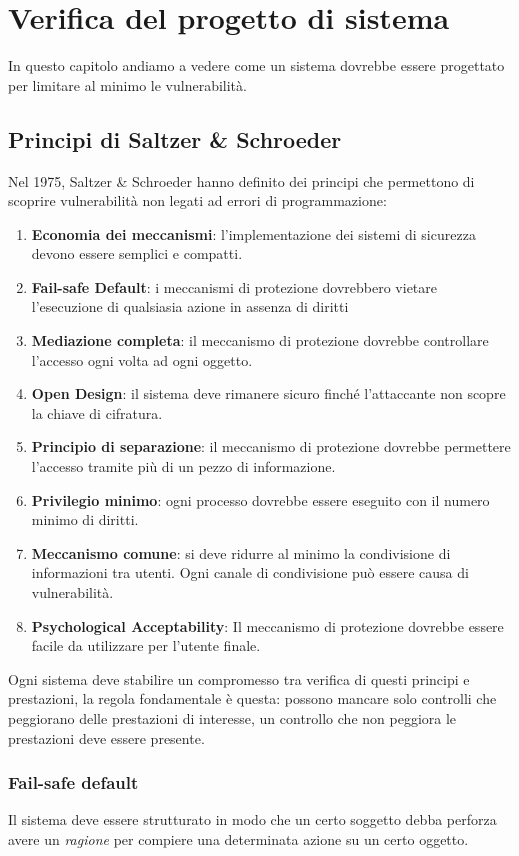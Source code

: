 \chapter{Verifica del progetto di sistema}
In questo capitolo andiamo a vedere come un sistema dovrebbe essere progettato per limitare al minimo le
vulnerabilità.

\section{Principi di Saltzer \& Schroeder}
Nel 1975, Saltzer \& Schroeder hanno definito dei principi che permettono di scoprire vulnerabilità non legati ad
errori di programmazione:
\begin{enumerate}
	\item \textbf{Economia dei meccanismi}: l'implementazione dei sistemi di sicurezza devono essere semplici e
	      compatti.
	\item \textbf{Fail-safe Default}: i meccanismi di protezione dovrebbero vietare l'esecuzione di qualsiasia
	      azione in assenza di diritti
	\item \textbf{Mediazione completa}: il meccanismo di protezione dovrebbe controllare l'accesso ogni volta ad
	      ogni oggetto.
	\item \textbf{Open Design}: il sistema deve rimanere sicuro finché l'attaccante non scopre la chiave di
	      cifratura.
	\item \textbf{Principio di separazione}: il meccanismo di protezione dovrebbe permettere l'accesso tramite più
	      di un pezzo di informazione.
	\item \textbf{Privilegio minimo}: ogni processo dovrebbe essere eseguito con il numero minimo di diritti.
	\item \textbf{Meccanismo comune}: si deve ridurre al minimo la condivisione di informazioni tra utenti. Ogni
	      canale di condivisione può essere causa di vulnerabilità.
	\item \textbf{Psychological Acceptability}: Il meccanismo di protezione dovrebbe essere facile da utilizzare
	      per l'utente finale.
\end{enumerate}
Ogni sistema deve stabilire un compromesso tra verifica di questi principi e prestazioni, la regola fondamentale è
questa: possono mancare solo controlli che peggiorano delle prestazioni di interesse, un controllo che non peggiora
le prestazioni deve essere presente.

\subsection{Fail-safe default}
Il sistema deve essere strutturato in modo che un certo soggetto debba perforza avere un \emph{ragione} per compiere
una determinata azione su un certo oggetto.

